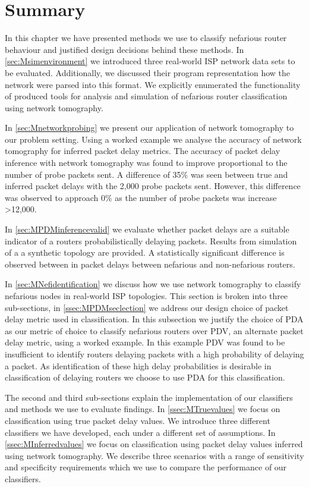 \section{Summary}
In this chapter we have presented methods we use to classify nefarious router behaviour and justified design decisions behind these methods. In \cref{sec:Msimenvironment} we introduced three real-world ISP network data sets to be evaluated. Additionally, we discussed their program representation how the network were parsed into this format. We explicitly enumerated the functionality of produced tools for analysis and simulation of nefarious router classification using network tomography.\par
In \cref{sec:Mnetworkprobing} we present our application of network tomography to our problem setting. Using a worked example we analyse the accuracy of network tomography for inferred packet delay metrics. The accuracy of packet delay inference with network tomography was found to improve proportional to the number of probe packets sent. A difference of 35\% was seen between true and inferred packet delays with the 2,000 probe packets sent. However, this difference was observed to approach 0\% as the number of probe packets was increase >12,000.\par
In \cref{sec:MPDMinferencevalid} we evaluate whether packet delays are a suitable indicator of a routers probabilistically delaying packets. Results from simulation of a a synthetic topology are provided. A statistically significant difference is observed between in packet delays between nefarious and non-nefarious routers.\par
In \cref{sec:MNefidentification} we discuss how we use network tomography to classify nefarious nodes in real-world ISP topologies. This section is broken into three sub-sections, in \cref{ssec:MPDMseclection} we address our design choice of packet delay metric used in classification.
In this subsection we justify the choice of PDA as our metric of choice to classify nefarious routers over PDV, an alternate packet delay metric, using a worked example. In this example PDV was found to be insufficient to identify routers delaying packets with a high probability of delaying a packet. As identification of these high delay probabilities is desirable in classification of delaying routers we choose to use PDA for this classification.\par
The second and third sub-sections explain the implementation of our classifiers and methods we use to evaluate findings. In \cref{ssec:MTruevalues} we focus on classification using true packet delay values. We introduce three different classifiers we have developed, each under a different set of assumptions. In \cref{ssec:MInferredvalues} we focus on classification using packet delay values inferred using network tomography. We describe three scenarios with a range of sensitivity and specificity requirements which we use to compare the performance of our classifiers.\par
